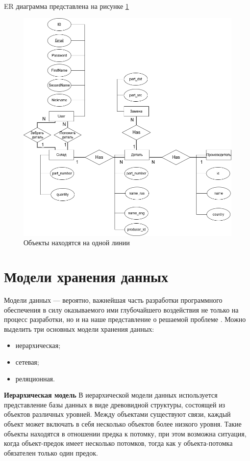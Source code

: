 ER диаграмма представлена на рисунке \ref{img:er-diargram}
\begin{center}
	\begin{figure}[H]
		\centering
		\includegraphics[scale=0.5]{inc/img/er-diagram.png}
		\caption{Объекты находятся на одной линии}
		\label{img:er-diargram}
	\end{figure}
\end{center}

\section{Модели хранения данных}

Модели данных — вероятно, важнейшая часть разработки программного обеспечения в силу оказываемого ими глубочайшего воздействия не только на процесс
разработки, но и на наше представление о решаемой проблеме \cite{kleppman}.
Можно выделить три основных модели хранения данных:
\begin{itemize}
	\item иерархическая;
	\item сетевая;
	\item реляционная.
\end{itemize}

\textbf{Иерархическая модель}
В иерархической модели данных используется представление базы данных в виде древовидной структуры, состоящей из объектов различных уровней. Между объектами существуют связи, каждый объект может включать в себя несколько объектов более низкого уровня. Такие объекты находятся в отношении предка к потомку, при этом возможна ситуация, когда объект-предок имеет несколько потомков, тогда как у объекта-потомка обязателен только один предок.

